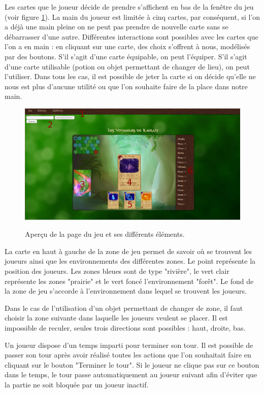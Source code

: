 \documentclass[12pt]{report}
\begin{document}
		Les cartes que le joueur décide de prendre s'affichent en bas de la fenêtre du jeu (voir figure \ref{fig:manual}). La main du joueur est limitée à cinq cartes, par conséquent, si l'on a déjà une main pleine on ne peut pas prendre de nouvelle carte sans se débarrasser d'une autre. Différentes interactions sont possibles avec les cartes que l'on a en main : en cliquant sur une carte, des choix s'offrent à nous, modélisés par des boutons. S'il s'agit d'une carte équipable, on peut l'équiper. S'il s'agit d'une carte utilisable (potion ou objet permettant de changer de lieu), on peut l'utiliser. Dans tous les cas, il est possible de jeter la carte si on décide qu'elle ne nous est plus d'aucune utilité ou que l'on souhaite faire de la place dans notre main.

		\begin{figure}[h!]
			\centering
			\includegraphics[scale=0.35]{images/manual.png}
			\label{fig:manual}
			\caption{Aperçu de la page du jeu et ses différents éléments.}
		\end{figure}

		La carte en haut à gauche de la zone de jeu permet de savoir où se trouvent les joueurs ainsi que les environnements des différentes zones. Le point représente la position des joueurs. Les zones bleues sont de type "rivière", le vert clair représente les zones "prairie" et le vert foncé l'environnement "forêt". Le fond de la zone de jeu s'accorde à l'environnement dans lequel se trouvent les joueurs.

		Dans le cas de l'utilisation d'un objet permettant de changer de zone, il faut choisir la zone suivante dans laquelle les joueurs veulent se placer. Il est impossible de reculer, seules trois directions sont possibles : haut, droite, bas.

		Un joueur dispose d'un temps imparti pour terminer son tour. Il est possible de passer son tour après avoir réalisé toutes les actions que l'on souhaitait faire en cliquant sur le bouton "Terminer le tour". Si le joueur ne clique pas sur ce bouton dans le temps, le tour passe automatiquement au joueur suivant afin d'éviter que la partie ne soit bloquée par un joueur inactif.
\end{document}
